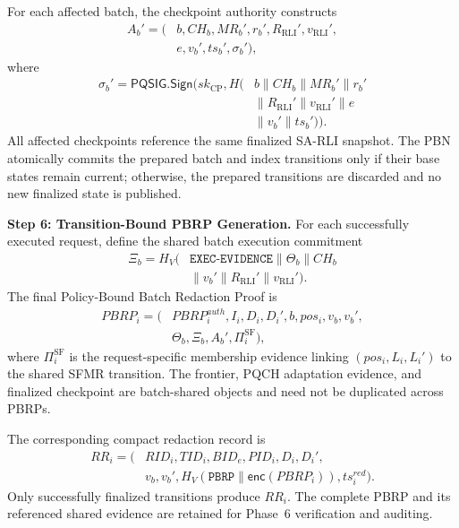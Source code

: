 \documentclass[lettersize,journal]{IEEEtran}
\begin{document}
For each affected batch, the checkpoint authority constructs
\begin{equation}
\begin{aligned}
A_b'=\big(&b,CH_b,MR_b',r_b',
R_{\mathrm{RLI}}',v_{\mathrm{RLI}}',\\
&e,v_b',ts_b',\sigma_b'\big),
\end{aligned}
\end{equation}
where
\begin{equation}
\begin{aligned}
\sigma_b'=
\mathsf{PQSIG.Sign}\big(
sk_{\mathrm{CP}},
H(&b\parallel CH_b\parallel MR_b'\parallel r_b'\\
&\parallel R_{\mathrm{RLI}}'\parallel v_{\mathrm{RLI}}'
\parallel e\\
&\parallel v_b'\parallel ts_b')\big).
\end{aligned}
\end{equation}
All affected checkpoints reference the same finalized SA-RLI snapshot.
The PBN atomically commits the prepared batch and index transitions
only if their base states remain current; otherwise, the prepared
transitions are discarded and no new finalized state is published.

\medskip
\noindent\textbf{Step 6: Transition-Bound PBRP Generation.}
For each successfully executed request, define the shared batch
execution commitment
\begin{equation}
\begin{aligned}
\Xi_b=
H_V\big(&\texttt{EXEC-EVIDENCE}\parallel
\Theta_b\parallel CH_b\\
&\parallel v_b'\parallel
R_{\mathrm{RLI}}'\parallel v_{\mathrm{RLI}}'\big).
\end{aligned}
\end{equation}
The final Policy-Bound Batch Redaction Proof is
\begin{equation}
\begin{aligned}
PBRP_i=\big(
&PBRP_i^{auth},I_i,D_i,D_i',
b,pos_i,v_b,v_b',\\
&\Theta_b,\Xi_b,A_b',\Pi_i^{\mathrm{SF}}\big),
\end{aligned}
\end{equation}
where $\Pi_i^{\mathrm{SF}}$ is the request-specific membership evidence
linking $(pos_i,L_i,L_i')$ to the shared SFMR transition. The frontier,
PQCH adaptation evidence, and finalized checkpoint are batch-shared
objects and need not be duplicated across PBRPs.

The corresponding compact redaction record is
\begin{equation}
\begin{aligned}
RR_i=\big(
&RID_i,TID_i,BID_e,PID_i,D_i,D_i',\\
&v_b,v_b',H_V(\texttt{PBRP}\parallel
\mathsf{enc}(PBRP_i)),ts_i^{red}\big).
\end{aligned}
\end{equation}
Only successfully finalized transitions produce $RR_i$. The complete
PBRP and its referenced shared evidence are retained for Phase~6
verification and auditing.
\end{document}
